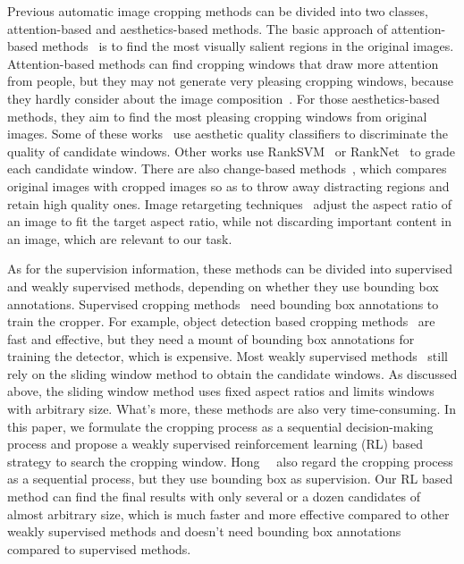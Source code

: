 \documentclass[10pt,twocolumn,letterpaper]{article}
\begin{document}
Previous automatic image cropping methods can be divided into two classes, attention-based and aesthetics-based methods. The basic approach of attention-based methods~\cite{suh2003automatic,stentiford2007attention,park2012modeling,chen2016automatic} is to find the most visually salient regions in the original images. Attention-based methods can find cropping windows that draw more attention from people, but they may not generate very pleasing cropping windows, because they hardly consider about the image composition~\cite{chen2017quantitative}. For those aesthetics-based methods, they aim to find the most pleasing cropping windows from original images. Some of these works~\cite{nishiyama2009sensation,fang2014automatic} use aesthetic quality classifiers to discriminate the quality of candidate windows. Other works use RankSVM~\cite{chen2017quantitative} or RankNet~\cite{chen-acmmm-2017} to grade each candidate window. There are also change-based methods~\cite{yan2013learning}, which compares original images with cropped images so as to throw away distracting regions and retain high quality ones. Image retargeting techniques~\cite{cho2017weakly,chen2017learning} adjust the aspect ratio of an image to fit the target aspect ratio, while not discarding important content in an image, which are relevant to our task.

As for the supervision information, these methods can be divided into supervised and weakly supervised methods, depending on whether they use bounding box annotations. Supervised cropping methods~\cite{hongcnn,esmaeili2016fast,wang2015learning,wang2017deep} need bounding box annotations to train the cropper. For example, object detection based cropping methods~\cite{esmaeili2016fast,wang2017deep} are fast and effective, but they need a mount of bounding box annotations for training the detector, which is expensive. Most weakly supervised methods~\cite{fang2014automatic,chen-acmmm-2017,kao2017automatic} still rely on the sliding window method to obtain the candidate windows. As discussed above, the sliding window method uses fixed aspect ratios and limits windows with arbitrary size. What's more, these methods are also very time-consuming. In this paper, we formulate the cropping process as a sequential decision-making process and propose a weakly supervised reinforcement learning (RL) based strategy to search the cropping window. Hong~\etal~\cite{hongcnn} also regard the cropping process as a sequential process, but they use bounding box as supervision. Our RL based method can find the final results with only several or a dozen candidates of almost arbitrary size, which is much faster and more effective compared to other weakly supervised methods and doesn't need bounding box annotations compared to supervised methods.
\end{document}
